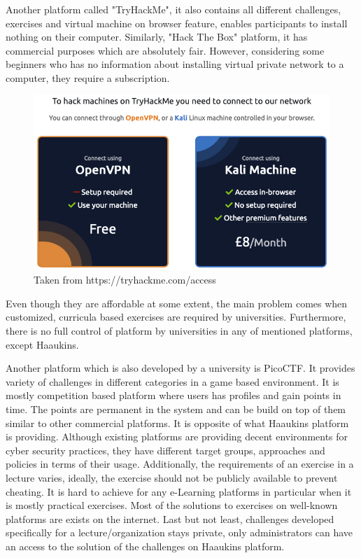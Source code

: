 Another platform called "TryHackMe", it also contains all different challenges, exercises and virtual machine on browser feature, enables participants to install nothing on their computer. Similarly, "Hack The Box" platform, it has commercial purposes which are absolutely fair. However, considering some beginners who has no information about installing virtual private network to a computer, they require a subscription. 

\begin{figure}[htbp]
\centerline{\includegraphics[scale=.5]{figures/try-hack-me.png}}
\caption{Taken from https://tryhackme.com/access}
\label{fig}
\end{figure}
 
 
Even though they are affordable at some extent, the main problem comes when customized, curricula based exercises are required by universities. Furthermore, there is no full control of platform by universities in any of mentioned platforms, except Haaukins. 

Another platform which is also developed by a university is PicoCTF\cite{183443}.
It provides variety of challenges in different categories in a game based environment. It is mostly competition based platform where users has profiles and gain points in time. The points are permanent in the system and can be build on top of them similar to other commercial platforms. It is opposite of what Haaukins platform is providing.
Although existing platforms are providing decent environments for cyber security practices, they have different target groups, approaches and policies in terms of their usage. Additionally, the requirements of an exercise in a lecture varies, ideally, the exercise should not be publicly available to prevent cheating. It is hard to achieve for any e-Learning platforms in particular when it is mostly practical exercises. Most of the solutions to exercises on well-known platforms are exists on the internet. Last but not least, challenges developed specifically for a lecture/organization stays private, only administrators can have an access to the solution of the challenges on Haaukins platform. 